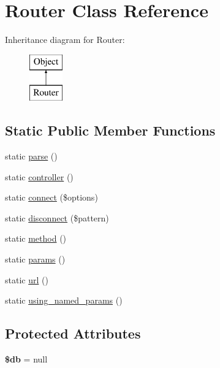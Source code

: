 \hypertarget{class_router}{
\section{Router Class Reference}
\label{class_router}
}
Inheritance diagram for Router:\begin{figure}[H]
\begin{center}
\leavevmode
\includegraphics[height=2.000000cm]{class_router}
\end{center}
\end{figure}
\subsection*{Static Public Member Functions}
\begin{DoxyCompactItemize}
\item 
static \hyperlink{class_router_a3eb96f245e327199178d041554997c0c}{parse} ()
\item 
static \hyperlink{class_router_ad79a780a0dc0d1a39276ff7eef4bb9e3}{controller} ()
\item 
static \hyperlink{class_router_ab2515f6606e1d5433ad647a3f6fada7d}{connect} (\$options)
\item 
static \hyperlink{class_router_a7144ff7564ee2a2f205c02f265a46e3b}{disconnect} (\$pattern)
\item 
static \hyperlink{class_router_a62dd5e8e38162737597eb9549e35d433}{method} ()
\item 
static \hyperlink{class_router_a83de84b002ae0361b46196eb2ebdf886}{params} ()
\item 
static \hyperlink{class_router_a66bae45e1a118d15d7b2b099251cca3b}{url} ()
\item 
static \hyperlink{class_router_afc54a4257c75898cf449d35eddf01666}{using\_\-named\_\-params} ()
\end{DoxyCompactItemize}
\subsection*{Protected Attributes}
\begin{DoxyCompactItemize}
\item 
\hypertarget{class_object_a1fa3127fc82f96b1436d871ef02be319}{
{\bfseries \$db} = null}
\label{class_object_a1fa3127fc82f96b1436d871ef02be319}

\end{DoxyCompactItemize}


